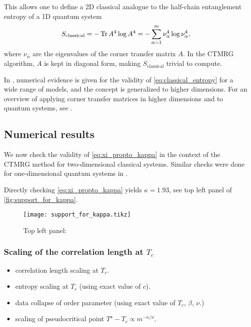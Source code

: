 This allows one to define a 2D classical analogue to the half-chain entanglement entropy of a 1D quantum system
\begin{equation}\label{eq:classical_entropy}
  S_{\text{classical}} = - \operatorname{Tr} A^4 \log A^4 = - \sum_{\alpha=1}^{m} \nu_{\alpha}^4 \log \nu_{\alpha}^4,
\end{equation}
where $\nu_{\alpha}$ are the eigenvalues of the corner transfer matrix $A$.
In the CTMRG algorithm, $A$ is kept in diagonal form, making $S_{\text{classical}}$ trivial to compute.

In \cite{huang2017holographic}, numerical evidence is given for the validity of \autoref{eq:classical_entropy} for a
wide range of models, and the concept is generalized to higher dimensions. For an overview of applying corner transfer
matrices in higher dimensions and to quantum systems, see \cite{orus2012exploring}.

\subsection{Numerical results}

We now check the validity of \autoref{eq:xi_propto_kappa} in the context of the CTMRG method for two-dimensional
classical systems. Similar checks were done for one-dimensional quantum systems in \cite{tagliacozzo2008scaling}.

Directly checking \autoref{eq:xi_propto_kappa} yields $\kappa = 1.93$, see top left panel of
\autoref{fig:support_for_kappa}.

\begin{figure}
  \texttt{[image: support\_for\_kappa.tikz]}
  \caption{Top left panel: }\label{fig:support_for_kappa}
\end{figure}

\subsubsection{Scaling of the correlation length at $T_c$}

\begin{itemize}
  \item correlation length scaling at $T_c$.
  \item entropy scaling at $T_c$ (using exact value of $c$).
  \item data collapse of order parameter (using exact value of $T_c$, $\beta$, $\nu$.)
  \item scaling of pseudocritical point $T^{\star} - T_c \propto m^{-\kappa / \nu}$.
\end{itemize}


